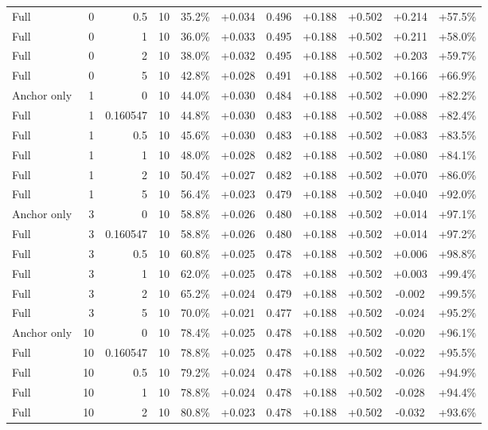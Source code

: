 \begin{table}[htbp]
\begin{tabular}{lrrrccccccc}
Full & 0 & 0.5 & 10 & 35.2\% & +0.034 & 0.496 & +0.188 & +0.502 & +0.214 & +57.5\% \\
Full & 0 & 1 & 10 & 36.0\% & +0.033 & 0.495 & +0.188 & +0.502 & +0.211 & +58.0\% \\
Full & 0 & 2 & 10 & 38.0\% & +0.032 & 0.495 & +0.188 & +0.502 & +0.203 & +59.7\% \\
Full & 0 & 5 & 10 & 42.8\% & +0.028 & 0.491 & +0.188 & +0.502 & +0.166 & +66.9\% \\
Anchor only & 1 & 0 & 10 & 44.0\% & +0.030 & 0.484 & +0.188 & +0.502 & +0.090 & +82.2\% \\
Full & 1 & 0.160547 & 10 & 44.8\% & +0.030 & 0.483 & +0.188 & +0.502 & +0.088 & +82.4\% \\
Full & 1 & 0.5 & 10 & 45.6\% & +0.030 & 0.483 & +0.188 & +0.502 & +0.083 & +83.5\% \\
Full & 1 & 1 & 10 & 48.0\% & +0.028 & 0.482 & +0.188 & +0.502 & +0.080 & +84.1\% \\
Full & 1 & 2 & 10 & 50.4\% & +0.027 & 0.482 & +0.188 & +0.502 & +0.070 & +86.0\% \\
Full & 1 & 5 & 10 & 56.4\% & +0.023 & 0.479 & +0.188 & +0.502 & +0.040 & +92.0\% \\
Anchor only & 3 & 0 & 10 & 58.8\% & +0.026 & 0.480 & +0.188 & +0.502 & +0.014 & +97.1\% \\
Full & 3 & 0.160547 & 10 & 58.8\% & +0.026 & 0.480 & +0.188 & +0.502 & +0.014 & +97.2\% \\
Full & 3 & 0.5 & 10 & 60.8\% & +0.025 & 0.478 & +0.188 & +0.502 & +0.006 & +98.8\% \\
Full & 3 & 1 & 10 & 62.0\% & +0.025 & 0.478 & +0.188 & +0.502 & +0.003 & +99.4\% \\
Full & 3 & 2 & 10 & 65.2\% & +0.024 & 0.479 & +0.188 & +0.502 & -0.002 & +99.5\% \\
Full & 3 & 5 & 10 & 70.0\% & +0.021 & 0.477 & +0.188 & +0.502 & -0.024 & +95.2\% \\
Anchor only & 10 & 0 & 10 & 78.4\% & +0.025 & 0.478 & +0.188 & +0.502 & -0.020 & +96.1\% \\
Full & 10 & 0.160547 & 10 & 78.8\% & +0.025 & 0.478 & +0.188 & +0.502 & -0.022 & +95.5\% \\
Full & 10 & 0.5 & 10 & 79.2\% & +0.024 & 0.478 & +0.188 & +0.502 & -0.026 & +94.9\% \\
Full & 10 & 1 & 10 & 78.8\% & +0.024 & 0.478 & +0.188 & +0.502 & -0.028 & +94.4\% \\
Full & 10 & 2 & 10 & 80.8\% & +0.023 & 0.478 & +0.188 & +0.502 & -0.032 & +93.6\% \\

\end{tabular}
\end{table}
